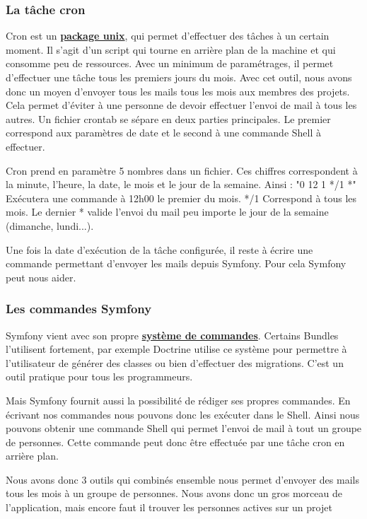 \documentclass[12pt, twoside, openright]{report}
\begin{document}
\subsubsection{La tâche cron}

Cron est un \href{https://doc.ubuntu-fr.org/cron}{\textbf{package unix}}, qui permet d'effectuer des tâches à un certain moment. Il s'agit d'un script qui tourne en arrière plan de la machine et qui consomme peu de ressources. Avec un minimum de paramétrages, il permet d'effectuer une tâche tous les premiers jours du mois. Avec cet outil, nous avons donc un moyen d'envoyer tous les mails tous les mois aux membres des projets. Cela permet d'éviter à une personne de devoir effectuer l'envoi de mail à tous les autres. Un fichier crontab se sépare en deux parties principales. Le premier correspond aux paramètres de date et le second à une commande Shell à effectuer. 

Cron prend en paramètre 5 nombres dans un fichier. Ces chiffres correspondent à la minute, l'heure, la date, le mois et le jour de la semaine. Ainsi : "0 12 1 */1 *" Exécutera une commande à 12h00 le premier du mois. */1 Correspond à tous les mois. Le dernier * valide l'envoi du mail peu importe le jour de la semaine (dimanche, lundi...). 

Une fois la date d’exécution de la tâche configurée, il reste à écrire une commande permettant d'envoyer les mails depuis Symfony. Pour cela Symfony peut nous aider.

\subsubsection{Les commandes Symfony}

Symfony vient avec son propre \href{https://symfony.com/doc/current/console.html}{\textbf{système de commandes}}. Certains Bundles l'utilisent fortement, par exemple Doctrine utilise ce système pour permettre à l'utilisateur de générer des classes ou bien d'effectuer des migrations. C'est un outil pratique pour tous les programmeurs. 

Mais Symfony fournit aussi la possibilité de rédiger ses propres commandes. En écrivant nos commandes nous pouvons donc les exécuter dans le Shell. Ainsi nous pouvons obtenir une commande Shell qui permet l'envoi de mail à tout un groupe de personnes. Cette commande peut donc être effectuée par une tâche cron en arrière plan.

Nous avons donc 3 outils qui combinés ensemble nous permet d'envoyer des mails tous les mois à un groupe de personnes. Nous avons donc un gros morceau de l'application, mais encore faut il trouver les personnes actives sur un projet 
\end{document}
